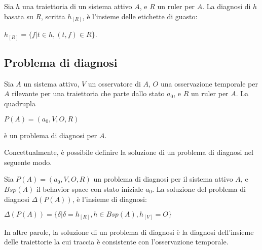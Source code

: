 \begin{defn}
Sia $h$ una traiettoria di un sistema attivo $A$, e $R$ un ruler per $A$. La diagnosi di $h$ basata su $R$, scritta $h_{[R]}$, è l'insieme delle etichette di guasto:
\begin{center}
	$h_{[R]} = \{ f | t \in h, (t,f) \in R \}$.
\end{center}
\end{defn}

\subsection{Problema di diagnosi}
\begin{defn}
Sia $A$ un sistema attivo, $V$ un osservatore di $A$, $O$ una osservazione temporale per $A$ rilevante per una traiettoria che parte dallo stato $a_0$, e $R$ un ruler per $A$. La quadrupla
\begin{center}
	$P(A) = (a_0,V,O,R)$
\end{center}
è un problema di diagnosi per $A$.
\end{defn}
Concettualmente, è possibile definire la soluzione di un problema di diagnosi nel seguente modo.
\begin{defn}
Sia $P(A) = (a_0,V,O,R)$ un problema di diagnosi per il sistema attivo $A$, e $Bsp(A)$ il behavior space con stato iniziale $a_0$. La soluzione del problema di diagnosi $\Delta(P(A))$, è l'insieme di diagnosi:
\begin{center}
	$\Delta(P(A)) = \{ \delta | \delta = h_{[R]}, h \in Bsp(A), h_{[V]} = O\}$
\end{center}
\end{defn}
In altre parole, la soluzione di un problema di diagnosi è la diagnosi dell'insieme delle traiettorie la cui traccia è consistente con l'osservazione temporale.

